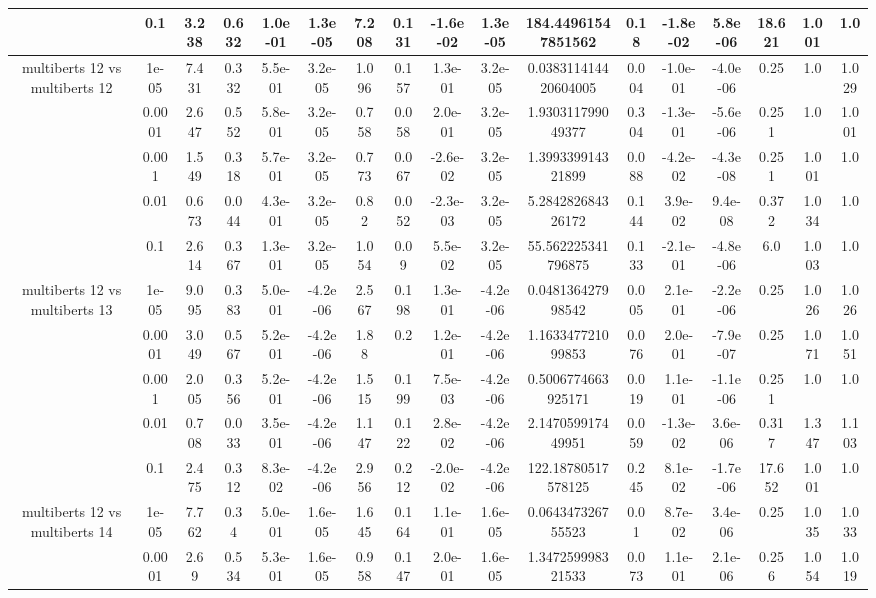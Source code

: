 \begin{tabular}{|c|c|c|c|c|c|c|c|c|c|c|c|c|c|c|c|c|}
 & 0.1 & 3.238 & 0.632 & 1.0e-01 & 1.3e-05 & 7.208 & 0.131 & -1.6e-02 & 1.3e-05 & 184.44961547851562 & 0.18 & -1.8e-02 & 5.8e-06 & 18.621 & 1.001 & 1.0 \\
\hline
\multirow{5}{*}{multiberts 12 vs multiberts 12} & 1e-05 & 7.431 & 0.332 & 5.5e-01 & 3.2e-05 & 1.096 & 0.157 & 1.3e-01 & 3.2e-05 & 0.038311414420604005 & 0.004 & -1.0e-01 & -4.0e-06 & 0.25 & 1.0 & 1.029 \\
 & 0.0001 & 2.647 & 0.552 & 5.8e-01 & 3.2e-05 & 0.758 & 0.058 & 2.0e-01 & 3.2e-05 & 1.930311799049377 & 0.304 & -1.3e-01 & -5.6e-06 & 0.251 & 1.0 & 1.001 \\
 & 0.001 & 1.549 & 0.318 & 5.7e-01 & 3.2e-05 & 0.773 & 0.067 & -2.6e-02 & 3.2e-05 & 1.399339914321899 & 0.088 & -4.2e-02 & -4.3e-08 & 0.251 & 1.001 & 1.0 \\
 & 0.01 & 0.673 & 0.044 & 4.3e-01 & 3.2e-05 & 0.82 & 0.052 & -2.3e-03 & 3.2e-05 & 5.284282684326172 & 0.144 & 3.9e-02 & 9.4e-08 & 0.372 & 1.034 & 1.0 \\
 & 0.1 & 2.614 & 0.367 & 1.3e-01 & 3.2e-05 & 1.054 & 0.09 & 5.5e-02 & 3.2e-05 & 55.562225341796875 & 0.133 & -2.1e-01 & -4.8e-06 & 6.0 & 1.003 & 1.0 \\
\hline
\multirow{5}{*}{multiberts 12 vs multiberts 13} & 1e-05 & 9.095 & 0.383 & 5.0e-01 & -4.2e-06 & 2.567 & 0.198 & 1.3e-01 & -4.2e-06 & 0.048136427998542 & 0.005 & 2.1e-01 & -2.2e-06 & 0.25 & 1.026 & 1.026 \\
 & 0.0001 & 3.049 & 0.567 & 5.2e-01 & -4.2e-06 & 1.88 & 0.2 & 1.2e-01 & -4.2e-06 & 1.163347721099853 & 0.076 & 2.0e-01 & -7.9e-07 & 0.25 & 1.071 & 1.051 \\
 & 0.001 & 2.005 & 0.356 & 5.2e-01 & -4.2e-06 & 1.515 & 0.199 & 7.5e-03 & -4.2e-06 & 0.5006774663925171 & 0.019 & 1.1e-01 & -1.1e-06 & 0.251 & 1.0 & 1.0 \\
 & 0.01 & 0.708 & 0.033 & 3.5e-01 & -4.2e-06 & 1.147 & 0.122 & 2.8e-02 & -4.2e-06 & 2.147059917449951 & 0.059 & -1.3e-02 & 3.6e-06 & 0.317 & 1.347 & 1.103 \\
 & 0.1 & 2.475 & 0.312 & 8.3e-02 & -4.2e-06 & 2.956 & 0.212 & -2.0e-02 & -4.2e-06 & 122.18780517578125 & 0.245 & 8.1e-02 & -1.7e-06 & 17.652 & 1.001 & 1.0 \\
\hline
\multirow{5}{*}{multiberts 12 vs multiberts 14} & 1e-05 & 7.762 & 0.34 & 5.0e-01 & 1.6e-05 & 1.645 & 0.164 & 1.1e-01 & 1.6e-05 & 0.064347326755523 & 0.01 & 8.7e-02 & 3.4e-06 & 0.25 & 1.035 & 1.033 \\
 & 0.0001 & 2.69 & 0.534 & 5.3e-01 & 1.6e-05 & 0.958 & 0.147 & 2.0e-01 & 1.6e-05 & 1.347259998321533 & 0.073 & 1.1e-01 & 2.1e-06 & 0.256 & 1.054 & 1.019 \\

\end{tabular}
